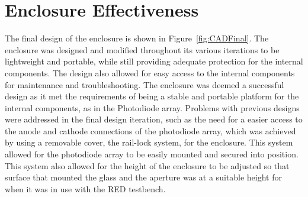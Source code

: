 \section{Enclosure Effectiveness}
The final design of the enclosure is shown in Figure~\ref{fig:CADFinal}.
 The enclosure was designed and modified throughout its various iterations to be lightweight and portable, while still providing adequate protection for the internal components. 
 The design also allowed for easy access to the internal components for maintenance and troubleshooting.
 The enclosure was deemed a successful design as it met the requirements of being a stable and portable platform for the internal components, as in the Photodiode array.
 Problems with previous designs were addressed in the final design iteration, such as the need for a easier access to the anode and cathode connections of the photodiode array, which was achieved by using a removable cover, the rail-lock system, for the enclosure.
 This system allowed for the photodiode array to be easily mounted and secured into position.
 This system also allowed for the height of the enclosure to be adjusted so that surface that mounted the glass and the aperture was at a suitable height for when it was in use with the RED testbench.


%         





